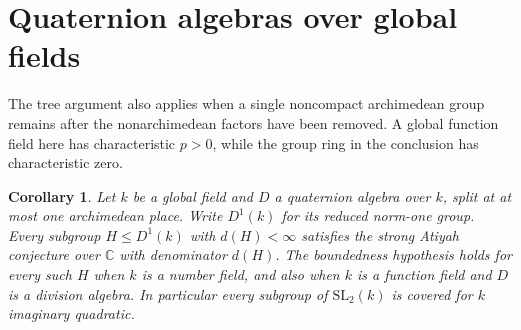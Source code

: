 \documentclass[11pt,a4paper,reqno]{amsart}
\numberwithin{equation}{section}
\newtheorem{corollary}[theorem]{Corollary}
\theoremstyle{remark}
\newcommand{\C}{\mathbb C}
\begin{document}
\section{Quaternion algebras over global fields}
The tree argument also applies when a single noncompact archimedean group remains after the nonarchimedean factors have been removed. A global function field here has characteristic \(p>0\), while the group ring in the conclusion has characteristic zero.

\begin{corollary}\label{cor:global}
Let \(k\) be a global field and \(D\) a quaternion algebra over \(k\), split at at most one archimedean place. Write \(D^1(k)\) for its reduced norm-one group. Every subgroup \(H\le D^1(k)\) with \(d(H)<\infty\) satisfies the strong Atiyah conjecture over \(\C\) with denominator \(d(H)\). The boundedness hypothesis holds for every such \(H\) when \(k\) is a number field, and also when \(k\) is a function field and \(D\) is a division algebra. In particular every subgroup of \(\mathrm{SL}_2(k)\) is covered for \(k\) imaginary quadratic.
\end{corollary}
\end{document}
